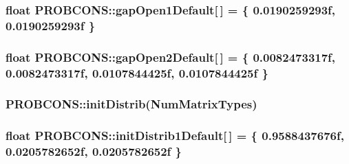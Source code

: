 \hypertarget{namespace_p_r_o_b_c_o_n_s_a5b6da1afa90c7279231be6813ac26c37}{
\subsubsection[{gap\+Open1\+Default}]{\setlength{\rightskip}{0pt plus 5cm}float P\+R\+O\+B\+C\+O\+N\+S\+::gap\+Open1\+Default\mbox{[}$\,$\mbox{]} = \{ 0.\+0190259293f, 0.\+0190259293f \}}}\label{namespace_p_r_o_b_c_o_n_s_a5b6da1afa90c7279231be6813ac26c37}
\hypertarget{namespace_p_r_o_b_c_o_n_s_a7b3932227ab3389404600ec5c3609d0d}{
\subsubsection[{gap\+Open2\+Default}]{\setlength{\rightskip}{0pt plus 5cm}float P\+R\+O\+B\+C\+O\+N\+S\+::gap\+Open2\+Default\mbox{[}$\,$\mbox{]} = \{ 0.\+0082473317f, 0.\+0082473317f, 0.\+0107844425f, 0.\+0107844425f \}}}\label{namespace_p_r_o_b_c_o_n_s_a7b3932227ab3389404600ec5c3609d0d}
\hypertarget{namespace_p_r_o_b_c_o_n_s_a4fa8c099c73924e7f54dc5dbf2377aff}{
\subsubsection[{init\+Distrib}]{ P\+R\+O\+B\+C\+O\+N\+S\+::init\+Distrib({\bf Num\+Matrix\+Types})}}\label{namespace_p_r_o_b_c_o_n_s_a4fa8c099c73924e7f54dc5dbf2377aff}
\hypertarget{namespace_p_r_o_b_c_o_n_s_aa8038b03680de2e2d9a1887d20b5467f}{
\subsubsection[{init\+Distrib1\+Default}]{\setlength{\rightskip}{0pt plus 5cm}float P\+R\+O\+B\+C\+O\+N\+S\+::init\+Distrib1\+Default\mbox{[}$\,$\mbox{]} = \{ 0.\+9588437676f, 0.\+0205782652f, 0.\+0205782652f \}}}\label{namespace_p_r_o_b_c_o_n_s_aa8038b03680de2e2d9a1887d20b5467f}
